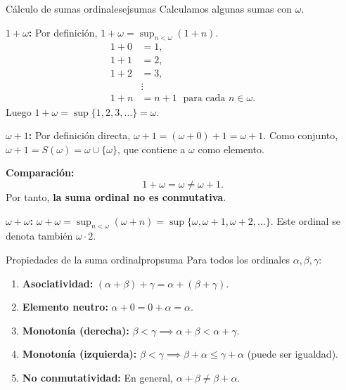\begin{ejemplo}{Cálculo de sumas ordinales}{ejsumas}
Calculamos algunas sumas con $\omega$.

\textbf{$1 + \omega$:} Por definición, $1 + \omega = \sup_{n < \omega}(1 + n)$.
\begin{align*}
  1 + 0 &= 1,\\
  1 + 1 &= 2,\\
  1 + 2 &= 3,\\
  &\vdots\\
  1 + n &= n+1 \;\text{ para cada } n \in \omega.
\end{align*}
Luego $1 + \omega = \sup\{1, 2, 3, \ldots\} = \omega$.

\textbf{$\omega + 1$:} Por definición directa, $\omega + 1 = (\omega + 0) + 1 = \omega + 1$. Como conjunto, $\omega + 1 = S(\omega) = \omega \cup \{\omega\}$, que contiene a $\omega$ como elemento.

\textbf{Comparación:}
\[
  1 + \omega = \omega \neq \omega + 1.
\]
Por tanto, \textbf{la suma ordinal no es conmutativa}.

\textbf{$\omega + \omega$:} $\omega + \omega = \sup_{n < \omega}(\omega + n) = \sup\{\omega, \omega+1, \omega+2, \ldots\}$. Este ordinal se denota también $\omega \cdot 2$.
\end{ejemplo}

\begin{proposicion}{Propiedades de la suma ordinal}{propsuma}
Para todos los ordinales $\alpha, \beta, \gamma$:
\begin{enumerate}[leftmargin=2em, label=(\roman*)]
  \item \textbf{Asociatividad:} $(\alpha + \beta) + \gamma = \alpha + (\beta + \gamma)$.
  \item \textbf{Elemento neutro:} $\alpha + 0 = 0 + \alpha = \alpha$.
  \item \textbf{Monotonía (derecha):} $\beta < \gamma \implies \alpha + \beta < \alpha + \gamma$.
  \item \textbf{Monotonía (izquierda):} $\beta < \gamma \implies \beta + \alpha \leq \gamma + \alpha$ \quad (puede ser igualdad).
  \item \textbf{No conmutatividad:} En general, $\alpha + \beta \neq \beta + \alpha$.
\end{enumerate}
\end{proposicion}

